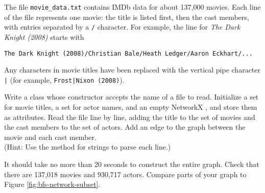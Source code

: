 \begin{problem} %
The file \texttt{movie\_data.txt} contains IMDb data for about 137,000 movies.
Each line of the file represents one movie: the title is listed first, then the cast members, with entries separated by a \texttt{/} character.
For example, the line for \emph{The Dark Knight (2008)} starts with
\begin{center}
\texttt{The Dark Knight (2008)/Christian Bale/Heath Ledger/Aaron Eckhart/...}
\end{center}
Any \li{/} characters in movie titles have been replaced with the vertical pipe character \texttt{|} (for example, \texttt{Frost|Nixon (2008)}).

Write a class whose constructor accepts the name of a file to read.
Initialize a set for movie titles, a set for actor names, and an empty NetworkX , and store them as attributes.
Read the file line by line, adding the title to the set of movies and the cast members to the set of actors.
Add an edge to the graph between the movie and each cast member.
\\(Hint: Use the  method for strings to parse each line.)

It should take no more than 20 seconds to construct the entire graph.
Check that there are 137,018 movies and 930,717 actors.
Compare parts of your graph to Figure \ref{fig:bfs-network-subset}.
\label{prob:bfs-movie-network-init}
\end{problem}

